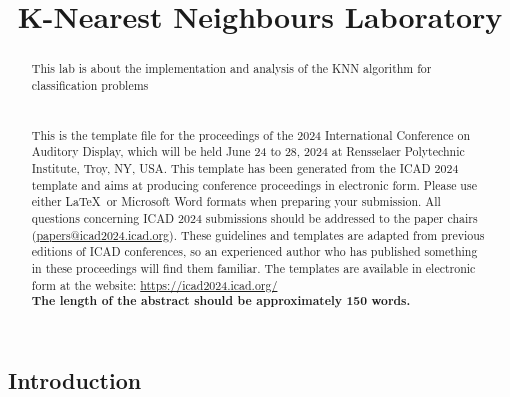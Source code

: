 \documentclass[a4paper,10pt,oneside]{article}
\title{K-Nearest Neighbours Laboratory}
\begin{document}
\ninept
\maketitle
\begin{sloppy}
\begin{abstract}
This lab is about the implementation and analysis of the KNN 
algorithm for classification problems
\\\\\\
This is the template file for the proceedings of the 2024 International 
Conference on Auditory Display, which will be held June 24 to 28, 2024 
at Rensselaer Polytechnic Institute, Troy, NY, USA. 
This template has been generated from the ICAD 2024 template and 
aims at producing conference proceedings in electronic form. 
Please use either \LaTeX\ or Microsoft Word 
formats when preparing your submission. 
All questions concerning ICAD 2024 
submissions should be addressed to the paper chairs 
(\href{mailto:papers@icad2024.icad.org}{papers@icad2024.icad.org}). 
These guidelines and templates are adapted from previous editions 
of ICAD conferences, so an experienced author who has published something
 in these proceedings will find them familiar. 
 The templates are available in electronic form at the website: 
 \url{https://icad2024.icad.org/}\\
\bf{The length of the abstract should be approximately 150 words.}

\end{abstract}

\section{Introduction}
\label{sec:intro}


\end{sloppy}
\end{document}
